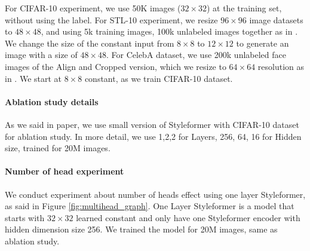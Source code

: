 \documentclass[10pt,twocolumn,letterpaper]{article}
\begin{document}
For CIFAR-10 experiment, we use 50K images ($32 \times 32$) at the training set, without using the label. For STL-10 experiment, we resize $96 \times 96$ image datasets to $48 \times 48$, and using 5k training images, 100k unlabeled images together as in \cite{jiang2021transgan}. We change the size of the constant input from $8 \times 8$ to $12 \times 12$ to generate an image with a size of $48 \times 48$. For CelebA dataset, we use 200k unlabeled face images of the Align and Cropped version, which we resize to $64 \times 64$ resolution as in \cite{jiang2021transgan}. We start at $8 \times 8$ constant, as we train CIFAR-10 dataset. 



\begin{table}[!t]
\centering
\caption{Details of Styleformer hyperparameters at low resolution synthesis. This model setting match with performance result at Table 2 in paper.}

\label{table:size model}
\end{table}


\paragraph{Ablation study details}
As we said in paper, we use small version of Styleformer with CIFAR-10 dataset for ablation study. In more detail, we use {1,2,2} for Layers, {256, 64, 16} for Hidden size, trained for 20M images. 

\paragraph{Number of head experiment}
We conduct experiment about number of heads effect using one layer Styleformer, as said in Figure \ref{fig:multihead_graph}. One Layer Styleformer is a model that starts with $32 \times 32$ learned constant and only have one Styleformer encoder with hidden dimension size 256. We trained the model for 20M images, same as ablation study. 
\end{document}

